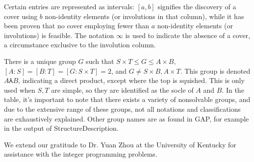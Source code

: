 Certain entries are represented as intervals: $[a, b]$ signifies the discovery of a cover using $b$ non-identity elements (or involutions in that column), while it has been proven that no cover employing fewer than $a$ non-identity elements (or involutions) is feasible. The notation $\infty$ is used to indicate the absence of a cover, a circumstance exclusive to the involution column.


There is a unique group $G$ such that $S \times T \leq G \leq A \times B$,
$[A:S] = [B:T] = [G:S\times T] = 2$, and $G \neq S \times B, A \times T$.
This group is denoted $A \Yup B$, indicating a direct product, except where
the top is squished. This is only used when $S,T$ are simple, so they
are identified as the socle of $A$ and $B$. In the table, it's important to note that there exists a variety of nonsolvable groups, and due to the extensive range of these groups, not all notations and classifications are exhaustively explained. Other group names are as found in
GAP, for example in the output of StructureDescription. 

We extend our gratitude to Dr. Yuan Zhou at the University of Kentucky for assistance with the integer programming problems.
\vspace{1cm}

